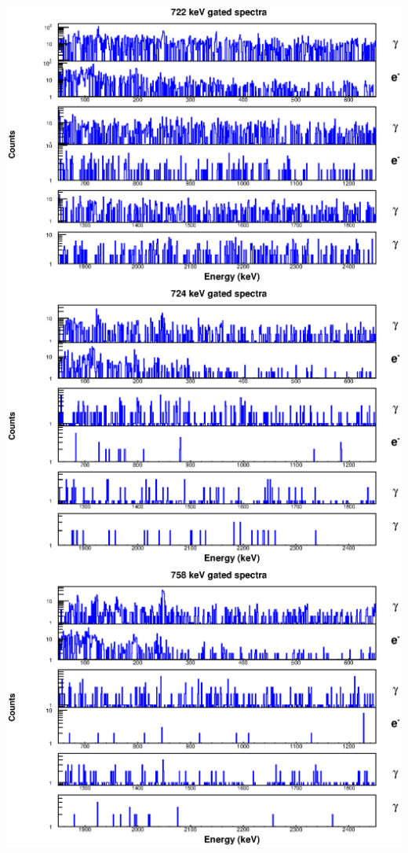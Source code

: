 \includegraphics[scale=0.8]{154Gd_Appendix/722_combined.eps}
\includegraphics[scale=0.8]{154Gd_Appendix/724_combined.eps}
\includegraphics[scale=0.8]{154Gd_Appendix/758_combined.eps}
